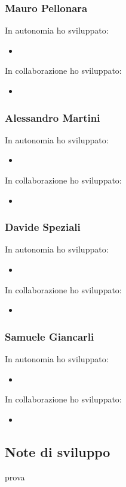 \subsubsection*{Mauro Pellonara} 
In autonomia ho sviluppato:
\begin{itemize}
    \item 
\end{itemize}
In collaborazione ho sviluppato:
\begin{itemize}
    \item 
\end{itemize}

\subsubsection*{Alessandro Martini}
In autonomia ho sviluppato:
\begin{itemize}
    \item 
\end{itemize}
In collaborazione ho sviluppato:
\begin{itemize}
    \item 
\end{itemize}

\subsubsection*{Davide Speziali}
In autonomia ho sviluppato:
\begin{itemize}
    \item 
\end{itemize}
In collaborazione ho sviluppato:
\begin{itemize}
    \item 
\end{itemize}

\subsubsection*{Samuele Giancarli}
In autonomia ho sviluppato:
\begin{itemize}
    \item 
\end{itemize}
In collaborazione ho sviluppato:
\begin{itemize}
    \item 
\end{itemize}

\subsection{Note di sviluppo}
prova